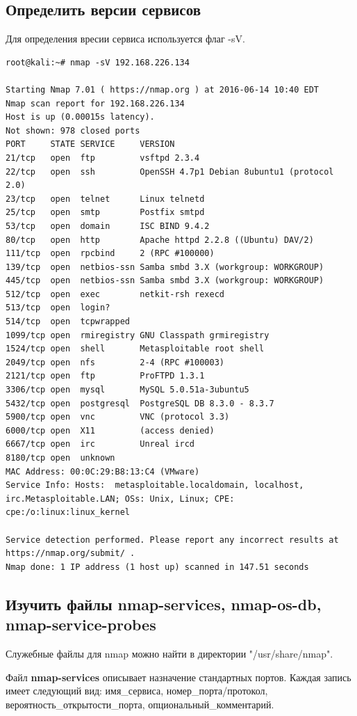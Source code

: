 \documentclass[10pt,a4paper,titlepage]{article}
\begin{document}
\subsection{Определить версии сервисов}
Для определения вресии сервиса используется флаг -sV.
\begin{verbatim}
root@kali:~# nmap -sV 192.168.226.134

Starting Nmap 7.01 ( https://nmap.org ) at 2016-06-14 10:40 EDT
Nmap scan report for 192.168.226.134
Host is up (0.00015s latency).
Not shown: 978 closed ports
PORT     STATE SERVICE     VERSION
21/tcp   open  ftp         vsftpd 2.3.4
22/tcp   open  ssh         OpenSSH 4.7p1 Debian 8ubuntu1 (protocol 2.0)
23/tcp   open  telnet      Linux telnetd
25/tcp   open  smtp        Postfix smtpd
53/tcp   open  domain      ISC BIND 9.4.2
80/tcp   open  http        Apache httpd 2.2.8 ((Ubuntu) DAV/2)
111/tcp  open  rpcbind     2 (RPC #100000)
139/tcp  open  netbios-ssn Samba smbd 3.X (workgroup: WORKGROUP)
445/tcp  open  netbios-ssn Samba smbd 3.X (workgroup: WORKGROUP)
512/tcp  open  exec        netkit-rsh rexecd
513/tcp  open  login?
514/tcp  open  tcpwrapped
1099/tcp open  rmiregistry GNU Classpath grmiregistry
1524/tcp open  shell       Metasploitable root shell
2049/tcp open  nfs         2-4 (RPC #100003)
2121/tcp open  ftp         ProFTPD 1.3.1
3306/tcp open  mysql       MySQL 5.0.51a-3ubuntu5
5432/tcp open  postgresql  PostgreSQL DB 8.3.0 - 8.3.7
5900/tcp open  vnc         VNC (protocol 3.3)
6000/tcp open  X11         (access denied)
6667/tcp open  irc         Unreal ircd
8180/tcp open  unknown
MAC Address: 00:0C:29:B8:13:C4 (VMware)
Service Info: Hosts:  metasploitable.localdomain, localhost, irc.Metasploitable.LAN; OSs: Unix, Linux; CPE: cpe:/o:linux:linux_kernel

Service detection performed. Please report any incorrect results at https://nmap.org/submit/ .
Nmap done: 1 IP address (1 host up) scanned in 147.51 seconds
\end{verbatim}

\pagebreak
\subsection{Изучить файлы nmap-services, nmap-os-db, nmap-service-probes}
Служебные файлы для nmap можно найти в директории "/usr/share/nmap".

Файл  \textbf{nmap-services} описывает назначение стандартных портов. Каждая запись имеет следующий вид: имя\_сервиса, номер\_порта/протокол, вероятность\_открытости\_порта, опциональный\_комментарий.
			
\end{document}

